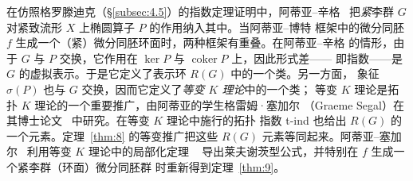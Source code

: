 \documentclass[11pt]{amsart}
\theoremstyle{definition}
\theoremstyle{remark}
\theoremstyle{plain}
\numberwithin{equation}{section}
\renewcommand{\:}{\colon}
\newcommand{\CC}{{\mathbb C}}
\newcommand{\ZZ}{{\mathbb Z}}
\DeclareMathOperator{\coker}{coker}
\DeclareMathOperator{\ind}{ind}
\DeclareMathOperator{\Fix}{Fix}
\begin{document}
在仿照格罗滕迪克（\S\ref{subsec:4.5}）的指数定理证明中，阿蒂亚–辛格~\cite{AS2}
把\emph{紧}李群 $G$ 对紧致流形 $X$ 上椭圆算子 $P$ 的作用纳入其中。当阿蒂亚–博特
框架中的微分同胚 $f$ 生成一个（紧）微分同胚环面时，两种框架有重叠。在阿蒂亚–辛格
的情形，由于 $G$ 与 $P$ 交换，它作用在 $\ker P$ 与 $\coker P$ 上，因此形式差——
即指数——是 $G$ 的虚拟表示。于是它定义了表示环 $R(G)$ 中的一个类。另一方面，
象征 $\sigma (P)$ 也与 $G$ 交换，因而它定义了\emph{等变 $K$ 理论}中的一个类；
等变 $K$ 理论是拓扑 $K$ 理论的一个重要推广，由阿蒂亚的学生格雷姆·塞加尔
（Graeme Segal）在其博士论文~\cite{Seg1} 中研究。在等变 $K$ 理论中施行的拓扑
指数 t-ind 也给出 $R(G)$ 的一个元素。定理~\ref{thm:8} 的等变推广把这些 $R(G)$
元素等同起来。阿蒂亚–塞加尔~\cite{ASeg} 利用等变 $K$ 理论中的局部化定理
~\cite{Seg1} 导出莱夫谢茨型公式，并特别在 $f$ 生成一个紧李群（环面）微分同胚群
时重新得到定理~\ref{thm:9}。
\end{document}
